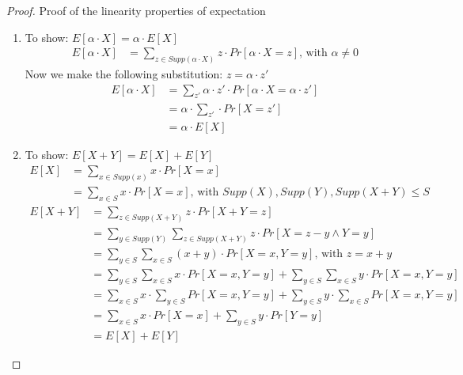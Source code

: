			\begin{proof}
			Proof of the linearity properties of expectation
			\begin{enumerate}
				\item To show: $E[\alpha \cdot X] = \alpha \cdot E[X]$
					\begin{align*}
						E[\alpha \cdot X] &= \sum\limits_{z \in Supp(\alpha \cdot X)} z \cdot Pr[\alpha \cdot X = z] \text{, with } \alpha \neq 0
					\end{align*}
					Now we make the following substitution: $z = \alpha \cdot z'$
					\begin{align*}
						E[\alpha \cdot X] &= \sum\limits_{z'} \alpha \cdot z' \cdot Pr[\alpha \cdot X = \alpha \cdot z']\\
						&= \alpha \cdot \sum\limits_{z'} \cdot Pr[X=z']\\
						&= \alpha \cdot E[X]
					\end{align*}
				
				\item To show: $E[X+Y] = E[X]+E[Y]$
					\begin{align*}
						E[X] &= \sum\limits_{x \in Supp(x)} x \cdot Pr[X=x]\\
						&= \sum\limits_{x \in S} x \cdot Pr[X=x] \text{, with } Supp(X),Supp(Y),Supp(X+Y) \leq S
					\end{align*}
					\begin{align*}			
						E[X+Y] &= \sum\limits_{z \in Supp(X+Y)} z \cdot Pr[X+Y = z]\\
						&= \sum\limits_{y \in Supp(Y)} \sum\limits_{z \in Supp(X+Y)} z \cdot Pr[X=z-y \wedge Y=y]\\
						&= \sum\limits_{y \in S} \sum\limits_{x \in S} (x+y) \cdot Pr[X=x, Y=y] \text{, with } z=x+y\\
						&= \sum\limits_{y \in S} \sum\limits_{x \in S} x \cdot Pr[X=x, Y=y] + \sum\limits_{y \in S} \sum\limits_{x \in S} y \cdot Pr[X=x, Y=y]\\
						&= \sum\limits_{x \in S} x \cdot \sum\limits_{y \in S} Pr[X=x, Y=y] + \sum\limits_{y \in S} y \cdot \sum\limits_{x \in S} Pr[X=x, Y=y]\\
						&= \sum\limits_{x \in S} x \cdot Pr[X=x] + \sum\limits_{y \in S} y \cdot Pr[Y=y]\\
						&= E[X] + E[Y]
					\end{align*}
			\end{enumerate}
			\end{proof}
		
